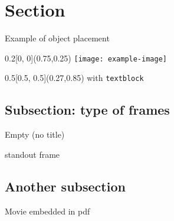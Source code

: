 \documentclass[xcolor=dvipsnames,professionalfonts, aspectratio=169]{beamer}
\begin{document}
\graphicspath{{./fig_slides/}}

\section{Section}
\begin{frame}{Example of object placement}

  \begin{textblock}{0.2}[0, 0](0.75,0.25)
    \texttt{[image: example-image]}
  \end{textblock}

  \begin{textblock}{0.5}[0.5, 0.5](0.27,0.85)
    with \texttt{textblock}
  \end{textblock}


\end{frame}

\subsection{Subsection: type of frames}
\begin{frame}[plain]
  \begin{center}
    Empty (no title)
  \end{center}
\end{frame}


\begin{frame}[standout]{standout frame}
\end{frame}

\subsection{Another subsection}
\begin{frame}{Movie embedded in pdf}


\end{frame}
\end{document}
